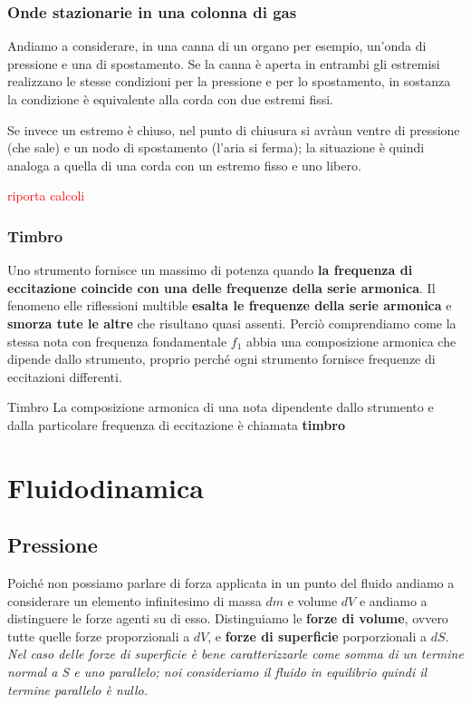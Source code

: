 \documentclass[x11names]{report}
\begin{document}
		\subsection{Onde stazionarie in una colonna di gas}
		Andiamo a considerare, in una canna di un organo per esempio, un'onda di pressione e una di spostamento. Se la canna è aperta in entrambi gli estremisi realizzano le stesse condizioni per la pressione e per lo spostamento, in sostanza la condizione è equivalente alla corda con due estremi fissi.
		
		Se invece un estremo è chiuso, nel punto di chiusura si avràun ventre di pressione (che sale) e un nodo di spostamento (l'aria si ferma); la situazione è quindi analoga a quella di una corda con un estremo fisso e uno libero.
		
		\begin{center}
			\textcolor{red}{riporta calcoli}
		\end{center}
		
		\subsection{Timbro}
		Uno strumento fornisce un massimo di potenza quando \textbf{la frequenza di eccitazione coincide con una delle frequenze della serie armonica}. Il fenomeno elle riflessioni multible \textbf{esalta le frequenze della serie armonica} e \textbf{smorza tute le altre} che risultano quasi assenti. Perciò comprendiamo come la stessa nota con frequenza fondamentale \(f_1\) abbia una composizione armonica che dipende dallo strumento, proprio perché ogni strumento fornisce frequenze di eccitazioni differenti.
		
		\begin{center}
			\colorbox{yblue}{\begin{minipage}{5.75in}
					\begin{blues}{Timbro}
						La composizione armonica di una nota dipendente dallo strumento e dalla particolare frequenza di eccitazione è chiamata \textbf{timbro}
					\end{blues}
			\end{minipage}}
		\end{center}
		
	
			
	
\chapter{Fluidodinamica}
	\section{Pressione}
	Poiché non possiamo parlare di forza applicata in un punto del fluido andiamo a considerare un elemento infinitesimo di massa \(dm\) e volume \(dV\) e andiamo a distinguere le forze agenti su di esso. Distinguiamo le \textbf{forze di volume}, ovvero tutte quelle forze proporzionali a \(dV\), e \textbf{forze di superficie} porporzionali a \(dS\). \textit{Nel caso delle forze di superficie è bene caratterizzarle come somma di un termine normal a S e uno parallelo; noi consideriamo il fluido in equilibrio quindi il termine parallelo è nullo.}
	
\end{document}
